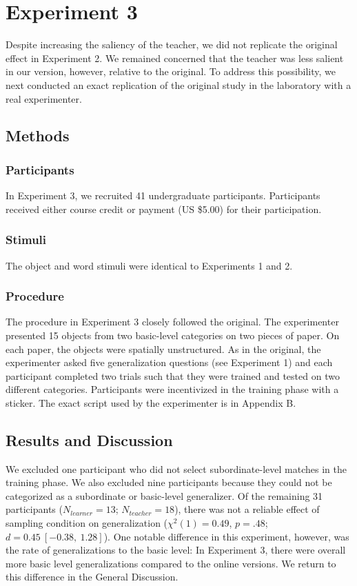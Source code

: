 \documentclass[man]{apa2}
\begin{document}
\section{Experiment 3}
Despite increasing the saliency of the teacher, we did not replicate the original effect in Experiment 2. We remained concerned that the teacher was less salient in our version, however, relative to the original. To address this possibility, we next conducted an exact replication of the original study in the laboratory with a real experimenter.

\subsection{Methods}

\subsubsection{Participants} In Experiment 3, we recruited 41 undergraduate participants. Participants received either course credit or payment (US \$5.00) for their participation. 

\subsubsection{Stimuli}
The object and word stimuli were identical to Experiments 1 and 2. 

\subsubsection{Procedure}
The procedure in Experiment 3 closely followed the original. The experimenter presented 15 objects from two basic-level categories on two pieces of paper. On each paper, the objects were spatially unstructured. As in the original, the experimenter asked five generalization questions (see Experiment 1) and each participant completed two trials such that they were trained and tested on two different categories. Participants were incentivized in the training phase with a sticker. The exact script used by the experimenter is in Appendix B. 

\subsection{Results and Discussion}
We excluded one participant who did not select subordinate-level matches in the training phase. We also excluded nine participants because they could not be categorized as a subordinate or basic-level generalizer. Of the remaining 31 participants ($N_{learner} = 13$; $N_{teacher} = 18$), there was not a reliable effect of sampling condition on generalization ($\chi^2(1) = 0.49$, $p = .48$; $d = 0.45\ [-0.38,\ 1.28]$). One notable difference in this experiment, however, was the rate of generalizations to the basic level: In Experiment 3, there were overall more basic level generalizations compared to the online versions. We return to this difference in the General Discussion.
\end{document}
